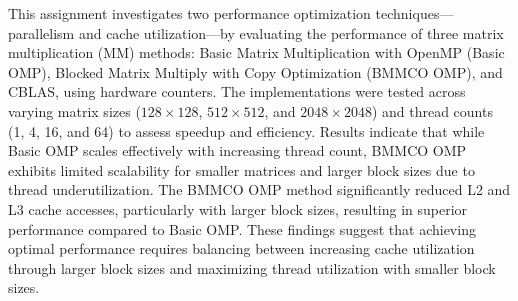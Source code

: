 

This assignment investigates two performance optimization techniques—parallelism and cache utilization—by evaluating the performance of three matrix multiplication (MM) methods: Basic Matrix Multiplication with OpenMP (Basic OMP), Blocked Matrix Multiply with Copy Optimization (BMMCO OMP), and CBLAS, using hardware counters. The implementations were tested across varying matrix sizes (\(128 \times 128\), \(512 \times 512\), and \(2048 \times 2048\)) and thread counts (1, 4, 16, and 64) to assess speedup and efficiency. Results indicate that while Basic OMP scales effectively with increasing thread count, BMMCO OMP exhibits limited scalability for smaller matrices and larger block sizes due to thread underutilization. The BMMCO OMP method significantly reduced L2 and L3 cache accesses, particularly with larger block sizes, resulting in superior performance compared to Basic OMP. These findings suggest that achieving optimal performance requires balancing between increasing cache utilization through larger block sizes and maximizing thread utilization with smaller block sizes.